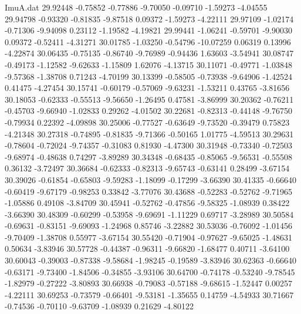 \begin{filecontents}{ImuA.dat}
  29.92448   -0.75852   -0.77886   -9.70050   -0.09710   -1.59273   -4.04555
  29.94798   -0.93320   -0.81835   -9.87518    0.09372   -1.59273   -4.22111
  29.97109   -1.02174   -0.71306   -9.94098    0.23112   -1.19582   -4.19821
  29.99441   -1.06241   -0.59701   -9.90030    0.09372   -0.52411   -4.31271
  30.01785   -1.03250   -0.54796  -10.07259    0.06319    0.13996   -4.22874
  30.06435   -0.75135   -0.86740   -9.76989   -0.94436    1.63603   -3.54941
  30.08747   -0.49173   -1.12582   -9.62633   -1.15809    1.62076   -4.13715
  30.11071   -0.49771   -1.03848   -9.57368   -1.38708    0.71243   -4.70199
  30.13399   -0.58505   -0.73938   -9.64906   -1.42524    0.41475   -4.27454
  30.15741   -0.60179   -0.57069   -9.63231   -1.53211    0.43765   -3.81656
  30.18053   -0.62333   -0.55513   -9.56650   -1.26495    0.47581   -3.86999
  30.20362   -0.76211   -0.45703   -9.66940   -1.02833    0.29262   -4.01502
  30.22681   -0.82313   -0.44148   -9.76750   -0.79934    0.22392   -4.09898
  30.25006   -0.77527   -0.63649   -9.73520   -0.39479    0.75823   -4.21348
  30.27318   -0.74895   -0.81835   -9.71366   -0.50165    1.01775   -4.59513
  30.29631   -0.78604   -0.72024   -9.74357   -0.31083    0.81930   -4.47300
  30.31948   -0.73340   -0.72503   -9.68974   -0.48638    0.74297   -3.89289
  30.34348   -0.68435   -0.85065   -9.56531   -0.55508    0.36132   -3.72497
  30.36684   -0.62333   -0.82313   -9.65743   -0.63141    0.28499   -3.67154
  30.39026   -0.61854   -0.65803   -9.59283   -1.18099   -0.17299   -3.66390
  30.41335   -0.66640   -0.60419   -9.67179   -0.98253    0.33842   -3.77076
  30.43688   -0.52283   -0.52762   -9.71965   -1.05886    0.49108   -3.84709
  30.45941   -0.52762   -0.47856   -9.58325   -1.08939    0.38422   -3.66390
  30.48309   -0.60299   -0.53958   -9.69691   -1.11229    0.69717   -3.28989
  30.50584   -0.69631   -0.83151   -9.69093   -1.24968    0.85746   -3.22882
  30.53036   -0.76092   -1.01456   -9.70409   -1.38708    0.55977   -3.67154
  30.55420   -0.71904   -0.97627   -9.65025   -1.48631    0.50634   -3.83946
  30.57728   -0.44387   -0.96311   -9.66820   -1.68477    0.40711   -3.64100
  30.60043   -0.39003   -0.87338   -9.58684   -1.98245   -0.19589   -3.83946
  30.62363   -0.66640   -0.63171   -9.73400   -1.84506   -0.34855   -3.93106
  30.64700   -0.74178   -0.53240   -9.78545   -1.82979   -0.27222   -3.80893
  30.66938   -0.79083   -0.57188   -9.68615   -1.52447    0.00257   -4.22111
  30.69253   -0.73579   -0.66401   -9.53181   -1.35655    0.14759   -4.54933
  30.71667   -0.74536   -0.70110   -9.63709   -1.08939    0.21629   -4.80122

\end{filecontents}
